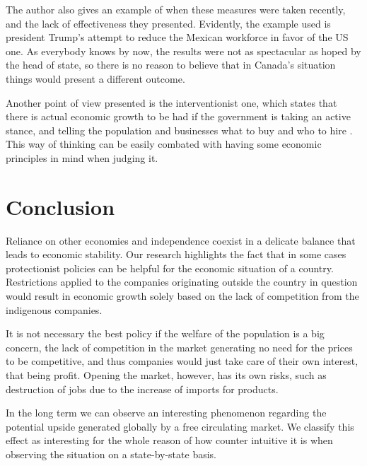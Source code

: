 \documentclass [11pt]{article}
\begin{document}
The author also gives an example of when these measures were taken recently, and the lack of effectiveness they presented. Evidently, the example used is president Trump’s attempt to reduce the Mexican workforce in favor of the US one. As everybody knows by now, the results were not as spectacular as hoped by the head of state, so there is no reason to believe that in Canada’s situation things would present a different outcome. 

Another point of view presented is the interventionist one, which states that there is actual economic growth to be had if the government is taking an active stance, and telling the population and businesses what to buy and who to hire \parencite{MatthewLau2020Adep}. This way of thinking can be easily combated with having some economic principles in mind when judging it. 



\section*{Conclusion}
Reliance on other economies and independence coexist in a delicate balance that leads to economic stability. Our research highlights the fact that in some cases protectionist policies can be helpful for the economic situation of a country. Restrictions applied to the companies originating outside the country in question would result in economic growth solely based on the lack of competition from the indigenous companies.  

It is not necessary the best policy if the welfare of the population is a big concern, the lack of competition in the market generating no need for the prices to be competitive, and thus companies would just take care of their own interest, that being profit. Opening the market, however, has its own risks, such as destruction of jobs due to the increase of imports for products. 

In the long term we can observe an interesting phenomenon regarding the potential upside generated globally by a free circulating market. We classify this effect as interesting for the whole reason of how counter intuitive it is when observing the situation on a state-by-state basis.  
\printbibliography
\end{document}
